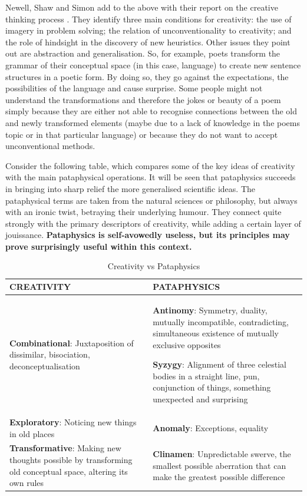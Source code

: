 Newell, Shaw and Simon add to the above with their report on the creative thinking process \autocite{Newell1963}. They identify three main conditions for creativity: the use of imagery in problem solving; the relation of unconventionality to creativity; and the role of hindsight in the discovery of new heuristics. Other issues they point out are abstraction and generalisation. So, for example, poets transform the grammar of their conceptual space (in this case, language) to create new sentence structures in a poetic form. By doing so, they go against the expectations, the possibilities of the language and cause surprise. Some people might not understand the transformations and therefore the jokes or beauty of a poem simply because they are either not able to recognise connections between the old and newly transformed elements (maybe due to a lack of knowledge in the poems topic or in that particular language) or because they do not want to accept unconventional methods.

Consider the following table, which compares some of the key ideas of creativity \autocite{Boden2003, Indurkhya, Koestler1964} with the main pataphysical operations. It will be seen that pataphysics succeeds in bringing into sharp relief the more generalised scientific ideas. The pataphysical terms are taken from the natural sciences or philosophy, but always with an ironic twist, betraying their underlying humour. They connect quite strongly with the primary descriptors of creativity, while adding a certain layer of jouissance. \textbf{Pataphysics is self-avowedly useless, but its principles may prove surprisingly useful within this context.}

\begin{table}[htb]
  \begin{tabu}{XX}
  \toprule
  \textbf{CREATIVITY}
  &
  \textbf{PATAPHYSICS}
  \\ \midrule
  \textbf{Combinational}: Juxtaposition of dissimilar, bisociation, deconceptualisation
  &
  \textbf{Antinomy}: Symmetry, duality, mutually incompatible, contradicting, simultaneous existence of mutually exclusive opposites
  \par
  \textbf{Syzygy}: Alignment of three celestial bodies in a
  straight line, pun, conjunction of things, something unexpected
  and surprising
  \\ \midrule
  \textbf{Exploratory}: Noticing new things in old places
  &
  \textbf{Anomaly}: Exceptions, equality
  \\ \midrule
  \textbf{Transformative}: Making new thoughts possible by transforming old conceptual space, altering its own rules
  &
  \textbf{Clinamen}: Unpredictable swerve, the smallest possible aberration that can make the greatest possible difference
  \\
  \bottomrule
  \end{tabu}
\caption[Creativity vs Pataphysics]{Creativity vs Pataphysics}
\label{tab:creatpata}
\end{table}


